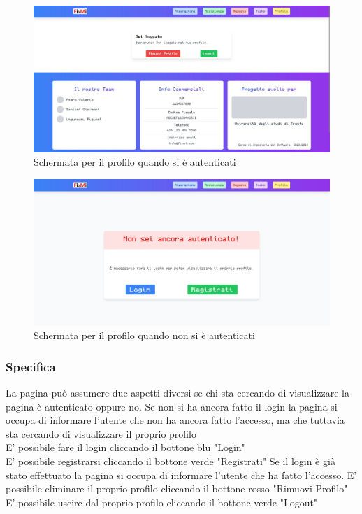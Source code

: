 \documentclass{report}
\begin{document}
\begin{figure}[H]
	\centering\includegraphics[width=1\textwidth]{images/microservizio-autenticazione/frontend/profilo.jpg}
	\caption{Schermata per il profilo quando si è autenticati}
\end{figure}
\begin{figure}[H]
	\centering\includegraphics[width=1\textwidth]{images/microservizio-autenticazione/frontend/nonautenticato.jpg}
	\caption{Schermata per il profilo quando non si è autenticati}
\end{figure}
\subsubsection*{Specifica}
La pagina può assumere due aspetti diversi se chi sta cercando di visualizzare la pagina è autenticato oppure no.
Se non si ha ancora fatto il login la pagina si occupa di informare l'utente che non ha ancora fatto l'accesso, ma che tuttavia sta cercando di visualizzare il proprio profilo\\
E' possibile fare il login cliccando il bottone blu "Login"\\
E' possibile registrarsi cliccando il bottone verde "Registrati"
Se il login è già stato effettuato la pagina si occupa di informare l'utente che ha fatto l'accesso.
E' possibile eliminare il proprio profilo cliccando il bottone rosso "Rimuovi Profilo"\\
E' possibile uscire dal proprio profilo cliccando il bottone verde "Logout"
\end{document}
